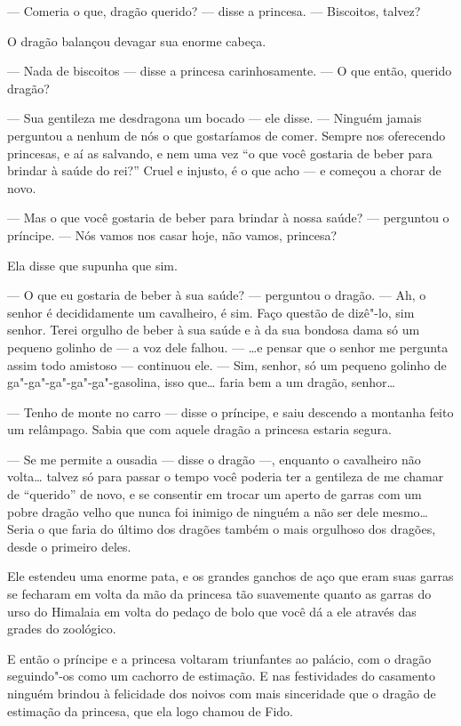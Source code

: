 --- Comeria o que, dragão querido? --- disse a princesa. --- Biscoitos,
talvez?

O dragão balançou devagar sua enorme cabeça.

--- Nada de biscoitos --- disse a princesa carinhosamente. --- O que então,
querido dragão?

--- Sua gentileza me desdragona um bocado --- ele disse. --- Ninguém jamais
perguntou a nenhum de nós o que gostaríamos de comer. Sempre nos
oferecendo princesas, e aí as salvando, e nem uma vez “o que você
gostaria de beber para brindar à saúde do rei?” Cruel e injusto, é o
que acho --- e começou a chorar de novo.

--- Mas o que você gostaria de beber para brindar à nossa saúde? --- perguntou
o príncipe. --- Nós vamos nos casar hoje, não vamos, princesa?

Ela disse que supunha que sim.

--- O que eu gostaria de beber à sua saúde? --- perguntou o dragão. --- Ah,
o senhor é decididamente um cavalheiro, é sim. Faço questão de
dizê"-lo, sim senhor. Terei orgulho de beber à sua saúde e à da sua
bondosa dama só um pequeno golinho de --- a voz dele falhou. --- \ldots{}e pensar que o senhor me pergunta assim todo amistoso --- continuou
ele. --- Sim, senhor, só um pequeno golinho de ga"-ga"-ga"-ga"-ga"-gasolina,
isso que\ldots{} faria bem a um dragão, senhor\ldots{}

--- Tenho de monte no carro --- disse o príncipe, e saiu descendo a
montanha feito um relâmpago. Sabia que
com aquele dragão a princesa estaria segura.

--- Se me permite a ousadia --- disse o dragão ---, enquanto o cavalheiro não
volta\ldots{} talvez só para passar o tempo você poderia ter a gentileza de
me chamar de “querido” de novo, e se consentir em trocar um aperto de
garras com um pobre dragão velho que nunca foi inimigo de ninguém a
não ser dele mesmo\ldots{} Seria o que faria do último dos dragões também o
mais orgulhoso dos dragões, desde o primeiro deles.

Ele estendeu uma enorme pata, e os grandes ganchos de aço que eram
suas garras se fecharam em volta da mão da princesa tão suavemente
quanto as garras do urso do Himalaia em volta do pedaço de bolo que
você dá a ele através das grades do zoológico.

E então o príncipe e a princesa voltaram triunfantes ao palácio, com o
dragão seguindo"-os como um cachorro de estimação. E nas
festividades do casamento ninguém brindou à felicidade dos noivos com
mais sinceridade que o dragão de estimação da princesa, que ela
logo chamou de Fido.

